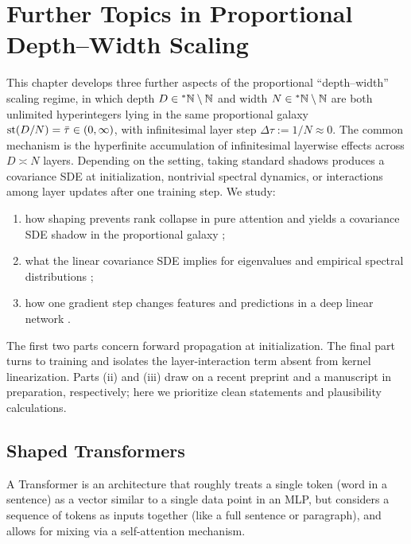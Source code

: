 \chapter{Further Topics in Proportional Depth--Width Scaling}
\label{ch:proportional-topics}

This chapter develops three further aspects of the proportional ``depth--width'' scaling regime, in which depth $D \in {}^*\mathbb{N} \setminus \mathbb{N}$ and width $N \in {}^*\mathbb{N} \setminus \mathbb{N}$ are both unlimited hyperintegers lying in the same proportional galaxy $\operatorname{st}(D/N) = \bar{\tau} \in (0, \infty)$, with infinitesimal layer step $\Delta\tau := 1/N \approx 0$. The common mechanism is the hyperfinite accumulation of infinitesimal layerwise effects across $D \asymp N$ layers. Depending on the setting, taking standard shadows produces a covariance SDE at initialization, nontrivial spectral dynamics, or interactions among layer updates after one training step. We study:
\begin{enumerate}[label=(\roman*)]
  \item how shaping prevents rank collapse in pure attention and yields a covariance SDE shadow in the proportional galaxy \cite{noci2023shaped};
  \item what the linear covariance SDE implies for eigenvalues and empirical spectral distributions \cite{li2026geometric};
  \item how one gradient step changes features and predictions in a deep linear network \cite{li2026feature}.
\end{enumerate}
The first two parts concern forward propagation at initialization. The final part turns to training and isolates the layer-interaction term absent from kernel linearization. Parts (ii) and (iii) draw on a recent preprint and a manuscript in preparation, respectively; here we prioritize clean statements and plausibility calculations.

\section{Shaped Transformers}
\label{sec:shaped-transformers}

A Transformer is an architecture that roughly treats a single token (word in a sentence) as a vector similar to a single data point in an MLP, but considers a sequence of tokens as inputs together (like a full sentence or paragraph), and allows for mixing via a self-attention mechanism.

